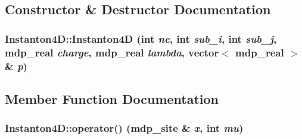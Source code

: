 \subsection{Constructor \& Destructor Documentation}
\hypertarget{class_instanton4_d_ab23484422ea50f59e0856d51cce1cb8b}{
\subsubsection[{Instanton4D}]{\setlength{\rightskip}{0pt plus 5cm}Instanton4D::Instanton4D (int {\em nc}, \/  int {\em sub\_\-i}, \/  int {\em sub\_\-j}, \/  {\bf mdp\_\-real} {\em charge}, \/  {\bf mdp\_\-real} {\em lambda}, \/  vector$<$ {\bf mdp\_\-real} $>$ \& {\em p})}}
\label{class_instanton4_d_ab23484422ea50f59e0856d51cce1cb8b}


\subsection{Member Function Documentation}
\hypertarget{class_instanton4_d_aa03767e0f05830b33e34b3be0f9fc447}{
\subsubsection[{operator()}]{ Instanton4D::operator() ({\bf mdp\_\-site} \& {\em x}, \/  int {\em mu})}}
\label{class_instanton4_d_aa03767e0f05830b33e34b3be0f9fc447}


